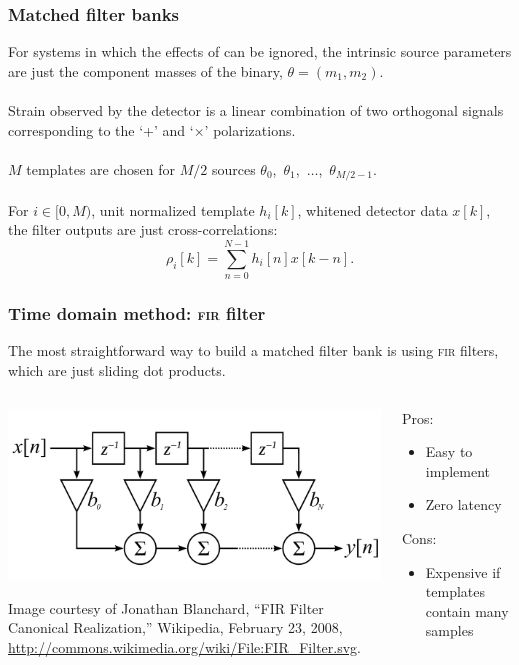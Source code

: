 \documentclass{beamer}
\begin{document}
\begin{frame}
	\frametitle{Matched filter banks}
	For systems in which the effects of can be ignored, the intrinsic source parameters are just the component masses of the binary, $\theta = (m_1, m_2)$. \\~\\

	Strain observed by the detector is a linear combination of two orthogonal signals corresponding to the `+' and `$\times$' polarizations. \\~\\

	$M$ templates are chosen for $M/2$ sources $\theta_0$,~$\theta_1$,~$\dots$,~$\theta_{M/2-1}$. \\~\\

	For $i \in [0, M)$, unit normalized template $h_i [k]$, whitened detector data $x[k]$, the filter outputs are just cross-correlations:
	$$
		\rho_i [k] = \sum_{n=0}^{N-1} h_{i}[n] x [k-n].
	$$
\end{frame}

\begin{frame}
	\frametitle{Time domain method: \textsc{fir} filter}
	The most straightforward way to build a matched filter bank is using \textsc{fir} filters, which are just sliding dot products.

	\begin{columns}
		\begin{column}{0.6\textwidth}
			\includegraphics[width=\textwidth]{figures/fir}
			\begin{flushleft}
				\scriptsize{Image courtesy of Jonathan Blanchard, ``FIR Filter Canonical Realization,'' Wikipedia, February 23, 2008, \url{http://commons.wikimedia.org/wiki/File:FIR_Filter.svg}.}
			\end{flushleft}
		\end{column}
		\begin{column}{0.4\textwidth}
			Pros:
			\begin{itemize}
				\item Easy to implement
				\item Zero latency
			\end{itemize}
			Cons:
			\begin{itemize}
				\item Expensive if templates contain many samples
			\end{itemize}
		\end{column}
	\end{columns}
\end{frame}
\end{document}
